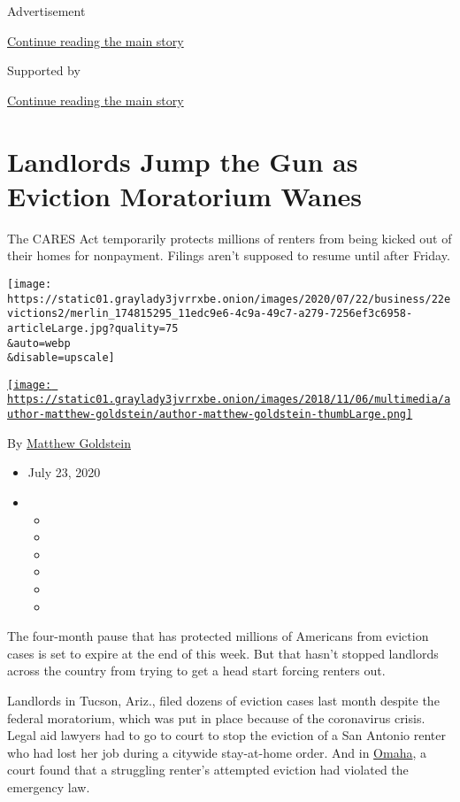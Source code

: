 Advertisement

\protect\hyperlink{after-top}{Continue reading the main story}

Supported by

\protect\hyperlink{after-sponsor}{Continue reading the main story}

\hypertarget{landlords-jump-the-gun-as-eviction-moratorium-wanes}{%
\section{Landlords Jump the Gun as Eviction Moratorium
Wanes}\label{landlords-jump-the-gun-as-eviction-moratorium-wanes}}

The CARES Act temporarily protects millions of renters from being kicked
out of their homes for nonpayment. Filings aren't supposed to resume
until after Friday.

\texttt{[image: https://static01.graylady3jvrrxbe.onion/images/2020/07/22/business/22evictions2/merlin\_174815295\_11edc9e6-4c9a-49c7-a279-7256ef3c6958-articleLarge.jpg?quality=75\\\&auto=webp\\\&disable=upscale]}

\href{https://www.nytimes3xbfgragh.onion/by/matthew-goldstein}{\texttt{[image: https://static01.graylady3jvrrxbe.onion/images/2018/11/06/multimedia/author-matthew-goldstein/author-matthew-goldstein-thumbLarge.png]}}

By
\href{https://www.nytimes3xbfgragh.onion/by/matthew-goldstein}{Matthew
Goldstein}

\begin{itemize}
\item
  July 23, 2020
\item
  \begin{itemize}
  \item
  \item
  \item
  \item
  \item
  \item
  \end{itemize}
\end{itemize}

The four-month pause that has protected millions of Americans from
eviction cases is set to expire at the end of this week. But that hasn't
stopped landlords across the country from trying to get a head start
forcing renters out.

Landlords in Tucson, Ariz., filed dozens of eviction cases last month
despite the federal moratorium, which was put in place because of the
coronavirus crisis. Legal aid lawyers had to go to court to stop the
eviction of a San Antonio renter who had lost her job during a citywide
stay-at-home order. And in
\href{https://www.nhlp.org/wp-content/uploads/Douglas-County-Order-of-Dismissal.pdf}{Omaha},
a court found that a struggling renter's attempted eviction had violated
the emergency law.

